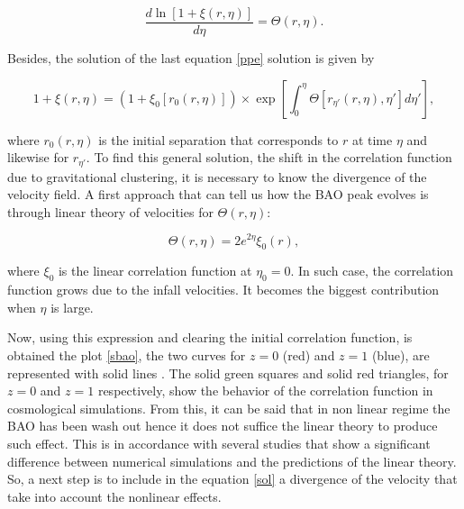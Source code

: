 \begin{equation}
\frac{d \ln [1+\xi(r,\eta)]}{d\eta} = \Theta(r,\eta).
\label{ppe}
\end{equation}

Besides, the solution of the last equation \ref{ppe} solution is given by 

\begin{equation}
1 + \xi(r,\eta) = (1+\xi_0[r_0(r,\eta)])\times \exp\left[\int_0^\eta \Theta[r_{\eta'}(r,\eta),\eta']d\eta'\right],
\label{sol}
\end{equation}

where $r_0(r,\eta)$ is the initial separation that corresponds to $r$ at time $\eta$ and likewise
for $r_{\eta'}$. To find this general solution, the shift in the correlation function due to 
gravitational clustering, it is necessary to know the divergence of the velocity field. 
A first approach that can tell us how the BAO peak evolves is through  linear theory of 
velocities for $\Theta(r,\eta)$:

\begin{equation}
\Theta(r,\eta) = 2e^{2\eta}\xi_0(r),
\label{linb}
\end{equation}

where $\xi_0$ is the linear correlation function at $\eta_0=0$. In such case, the correlation
function grows due to the infall velocities. It becomes the biggest contribution when $\eta$ is
large. 

Now, using this expression and clearing the initial correlation function, is obtained the 
plot \ref{sbao}, the two curves for $z=0$ (red) and $z=1$ (blue), are represented with solid lines \cite{motion}. 
The solid green squares and solid red triangles, for $z=0$ and $z=1$ respectively, show the 
behavior of the correlation function in cosmological simulations. From this, it
can be said that in non linear regime the BAO has been wash out hence it does not 
suffice the linear theory to produce such effect. This is in accordance with several 
studies that show a significant difference between numerical simulations and the predictions
of the linear theory. 
So, a next step is to include in the equation \ref{sol} a divergence of the velocity that
take into account the nonlinear effects. 


